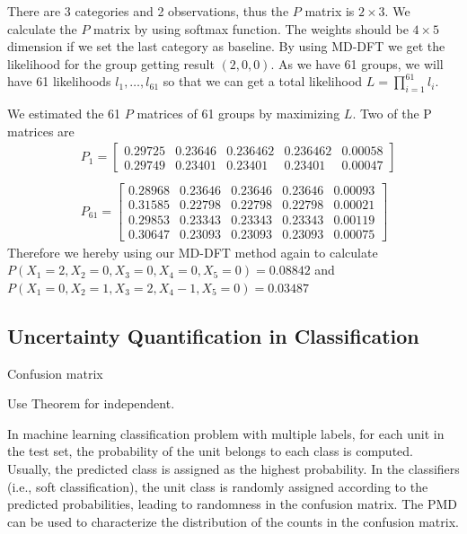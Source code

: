 \documentclass[12pt]{article}
\begin{document}
There are 3 categories and 2 observations, thus the $P$ matrix is $2 \times 3$. We calculate the $P$ matrix by using softmax function. The weights should be $4 \times 5$ dimension if we set the last category as baseline. By using MD-DFT we get the likelihood for the group getting result $\left(2,0,0\right)$. As we have 61 groups, we will have 61 likelihoods $l_1,\dots,l_{61}$ so that we can get a total likelihood $L = \prod_{i=1}^{61}l_i$.


We estimated the 61 $P$ matrices of 61 groups by maximizing $L$. Two of the P matrices are
\begin{align*}
    &P_1 =  \left[ \begin{array}{ccccc}
0.29725 &0.23646 &0.236462 &0.236462 &0.00058
 \\ 0.29749 & 0.23401& 0.23401& 0.23401 & 0.00047
 \end{array} \right]\\
\\
&P_{61} = \left[ \begin{array}{ccccc}
   0.28968 &  0.23646 &  0.23646 & 0.23646 & 0.00093
  \\
    0.31585 & 0.22798 & 0.22798 & 0.22798 & 0.00021
 \\
     0.29853 & 0.23343 & 0.23343 & 0.23343 & 0.00119
 \\
     0.30647 & 0.23093 & 0.23093 &  0.23093 &  0.00075
\end{array} \right]
\end{align*}
Therefore we hereby using our MD-DFT method again to calculate $P(X_1=2,X_2=0, X_3=0, X_4 = 0, X_5 = 0) =   0.08842$ and $P(X_1=0,X_2=1,X_3=2, X_4 - 1, X_5 = 0)=0.03487$


\subsection{Uncertainty Quantification in Classification}

Confusion matrix

Use Theorem for independent.

In machine learning classification problem with multiple labels, for each unit in the test set, the probability of the unit belongs to each class is computed. Usually, the predicted class is assigned as the highest probability. In the classifiers (i.e., soft classification), the unit class is randomly assigned according to the predicted probabilities, leading to randomness in the confusion matrix. The PMD can be used to characterize the distribution of the counts in the confusion matrix. 
\end{document}
